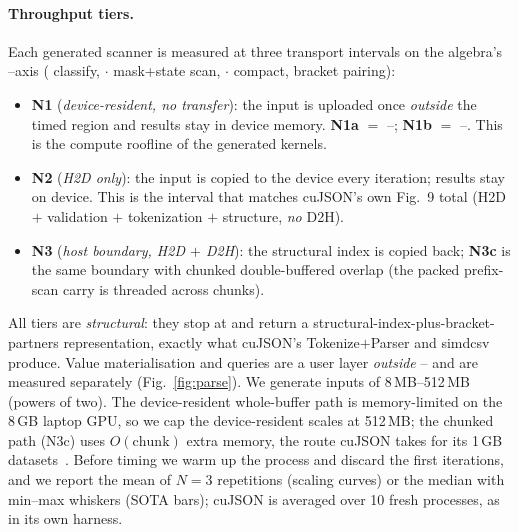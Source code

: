 \paragraph{Throughput tiers.}
Each generated scanner is measured at three transport intervals on the
algebra's \Rone--\Rsix axis (\Rone{} classify, \Rtwo$\cdot$\Rfour{} mask+state
scan, \Rthree$\cdot$\Rfive{} compact, \Rsix{} bracket pairing):
\begin{itemize}
  \item \textbf{N1} (\emph{device-resident, no transfer}): the input is uploaded
        once \emph{outside} the timed region and results stay in device memory.
        \textbf{N1a} $=$ \Rone--\Rfive; \textbf{N1b} $=$ \Rone--\Rsix.  This is
        the compute roofline of the generated kernels.
  \item \textbf{N2} (\emph{H2D only}): the input is copied to the device every
        iteration; results stay on device.  This is the interval that matches
        \textsf{cuJSON}'s own Fig.~9 total (H2D $+$ validation $+$ tokenization
        $+$ structure, \emph{no} D2H).
  \item \textbf{N3} (\emph{host boundary, H2D $+$ D2H}): the structural index is
        copied back; \textbf{N3c} is the same boundary with chunked
        double-buffered overlap (the packed prefix-scan carry is threaded across
        chunks).
\end{itemize}
All tiers are \emph{structural}: they stop at \Rsix{} and return a
structural-index-plus-bracket-partners representation, exactly what
\textsf{cuJSON}'s Tokenize$+$Parser and \textsf{simdcsv} produce.  Value
materialisation and queries are a user layer \emph{outside} \Rone--\Rsix{} and
are measured separately (Fig.~\ref{fig:parse}).  We generate inputs of
8\,MB--512\,MB (powers of two).  The device-resident whole-buffer path is
memory-limited on the 8\,GB laptop GPU, so we cap the device-resident scales at
512\,MB; the chunked path (N3c) uses $O(\text{chunk})$ extra memory, the route
\textsf{cuJSON} takes for its 1\,GB datasets~\cite{cujson}.  Before timing we
warm up the process and discard the first iterations, and we report the mean of
$N{=}3$ repetitions (scaling curves) or the median with min--max whiskers
(SOTA bars); \textsf{cuJSON} is averaged over 10 fresh processes, as in its own
harness.

